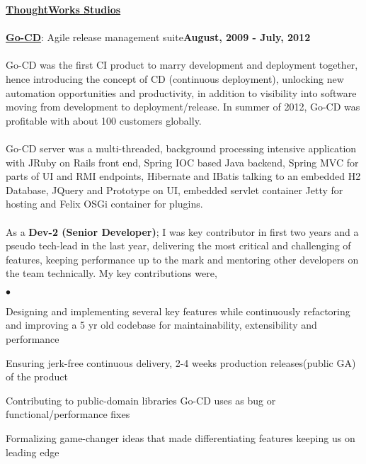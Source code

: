 \documentclass[margin,line]{res}
\newenvironment{list2}{
  \begin{list}{$\bullet$}{%
      \setlength{\itemsep}{0in}
      \setlength{\parsep}{0in} \setlength{\parskip}{0in}
      \setlength{\topsep}{0in} \setlength{\partopsep}{0in} 
      \setlength{\leftmargin}{0.2in}}}{\end{list}}
\begin{document}
\begin{resume}
{\underline {\bf ThoughtWorks Studios}}\\
\\
\href{https://www.thoughtworks.com/go/}{\bf Go-CD}: Agile release management suite\hfill {\bf August, 2009 - July, 2012}\\
\vspace{-.2cm}\\
Go-CD was the first CI product to marry development and deployment together, hence introducing the concept of CD (continuous deployment), unlocking new automation opportunities and productivity, in addition to visibility into software moving from development to deployment/release. In summer of 2012, Go-CD was profitable with about 100 customers globally.\\
\\
Go-CD server was a multi-threaded, background processing intensive application with JRuby on Rails front end, Spring IOC based Java backend, Spring MVC for parts of UI and RMI endpoints, Hibernate and IBatis talking to an embedded H2 Database, JQuery and Prototype on UI, embedded servlet container Jetty for hosting and Felix OSGi container for plugins.\\
\\
As a {\bf Dev-2 (Senior Developer)}; I was key contributor in first two years and a pseudo tech-lead in the last year, delivering the most critical and challenging of features, keeping performance up to the mark and mentoring other developers on the team technically. My key contributions were,\\
\begin{list2}
\item Designing and implementing several key features while continuously refactoring and improving a 5 yr old codebase for maintainability, extensibility and performance
\item Ensuring jerk-free continuous delivery, 2-4 weeks production releases(public GA) of the product
\item Contributing to public-domain libraries Go-CD uses as bug or functional/performance fixes
\item Formalizing game-changer ideas that made differentiating features keeping us on leading edge
\end{list2}


\end{resume}
\end{document}
